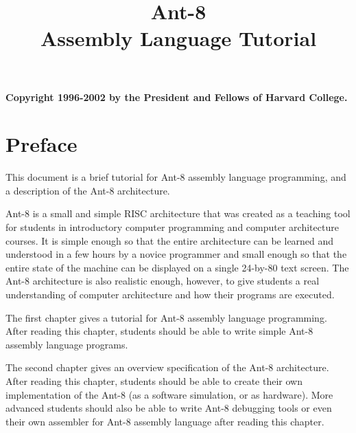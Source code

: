 \documentclass[11pt,makeidx,psfig]{book}
\title{\Huge\bf {\sc Ant-8}  \\ Assembly Language Tutorial }
\begin{document}
\frontmatter
\maketitle

{\bf Copyright 1996-2002 by the President and Fellows of Harvard College. }

\tableofcontents

\chapter{Preface}

This document is a brief tutorial for {\sc Ant-8} assembly language
programming, and a description of the {\sc Ant-8} architecture.

{\sc Ant-8} is a small and simple {\sc RISC} architecture that was
created as a teaching tool for students in introductory computer
programming and computer architecture courses.  It is simple enough so
that the entire architecture can be learned and understood in a few
hours by a novice programmer and small enough so that the entire state
of the machine can be displayed on a single 24-by-80 text screen.  The
{\sc Ant-8} architecture is also realistic enough, however, to give
students a real understanding of computer architecture and how their
programs are executed.

The first chapter gives a tutorial for {\sc Ant-8} assembly language
programming.  After reading this chapter, students should be able to
write simple {\sc Ant-8} assembly language programs.

The second chapter gives an overview specification of the {\sc Ant-8}
architecture.  After reading this chapter, students should be
able to create their own implementation of the {\sc Ant-8} (as a
software simulation, or as hardware).  More advanced students should
also be able to write {\sc Ant-8} debugging tools or even their own
assembler for {\sc Ant-8} assembly language after reading this chapter.

\mainmatter



% 





\backmatter

\printindex
\end{document}
